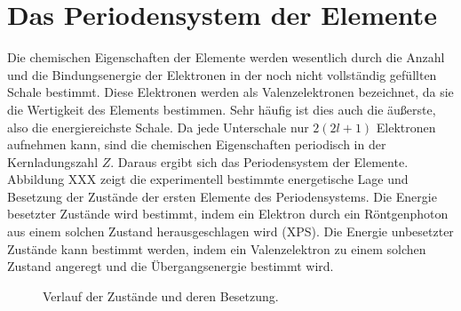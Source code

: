 \section{Das Periodensystem der Elemente}

Die chemischen Eigenschaften der Elemente werden wesentlich durch die Anzahl und die Bindungsenergie der Elektronen in der noch nicht vollständig gefüllten Schale bestimmt. Diese Elektronen werden als Valenzelektronen bezeichnet, da sie die Wertigkeit des Elements bestimmen. Sehr häufig ist dies auch die äußerste, also die energiereichste Schale. Da jede Unterschale nur $2 (2l +1)$ Elektronen aufnehmen kann, sind die chemischen Eigenschaften periodisch in der Kernladungszahl $Z$. Daraus ergibt sich das Periodensystem der Elemente. Abbildung XXX zeigt die experimentell bestimmte energetische Lage und Besetzung der Zustände der ersten Elemente des Periodensystems. Die Energie besetzter Zustände wird bestimmt, indem ein Elektron durch ein Röntgenphoton aus einem solchen Zustand herausgeschlagen wird (XPS). Die Energie unbesetzter Zustände kann bestimmt werden, indem ein Valenzelektron zu einem solchen Zustand angeregt und die Übergangsenergie bestimmt wird.

\begin{figure}
    \caption{Verlauf der Zustände und deren Besetzung.}
\end{figure}

